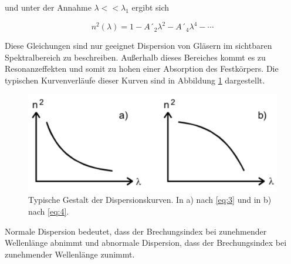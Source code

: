 und unter der Annahme $\lambda << \lambda_1$ ergibt sich

\begin{equation}
  n^2(\lambda) = 1 - A´_2 \lambda^2 - A´_4 \lambda^4 - \dotsb
  \label{eq:4}
\end{equation}

Diese Gleichungen sind nur geeignet Dispersion von Gläsern im sichtbaren
Spektralbereich zu beschreiben. Außerhalb dieses Bereiches kommt es zu Resonanzeffekten
und somit zu hohen einer Absorption des Festkörpers.
Die typischen Kurvenverläufe dieser Kurven sind in Abbildung \ref{abb:1} dargestellt.

\begin{figure}[H]
  \centering
  \includegraphics[width=\textwidth]{content/Dispersion.png}
  \caption{Typische Gestalt der Dispersionskurven. In a) nach \ref{eq:3} und in b) nach \ref{eq:4}. \cite{1}}
  \label{abb:1}
\end{figure}

Normale Dispersion bedeutet, dass der Brechungsindex bei zunehmender Wellenlänge abnimmt
und abnormale Dispersion, dass der Brechungsindex bei zunehmender Wellenlänge zunimmt.
